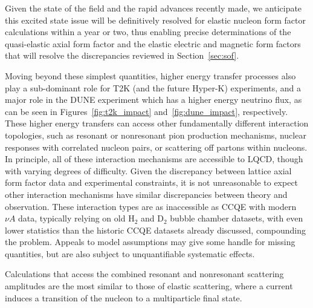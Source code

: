 Given the state of the field and the rapid advances recently made, we anticipate this excited state issue will be definitively resolved for elastic nucleon form factor calculations within a year or two, thus enabling precise determinations of the quasi-elastic axial form factor and the elastic electric and magnetic form factors that will resolve the discrepancies reviewed in Section~\ref{sec:sof}.


Moving beyond these simplest quantities, higher energy transfer processes also play a sub-dominant role for T2K (and the future
Hyper-K) experiments, and a major role in the DUNE experiment which has a higher energy neutrino
flux, as can be seen in Figures~\ref{fig:t2k_impact} and~\ref{fig:dune_impact}, respectively.
These higher energy transfers can access other fundamentally different interaction topologies,
 such as resonant or nonresonant pion production mechanisms,
 nuclear responses with correlated nucleon pairs,
 or scattering off partons within nucleons.
In principle, all of these interaction mechanisms are accessible to LQCD,
 though with varying degrees of difficulty.
Given the discrepancy between lattice axial form factor data and experimental constraints,
 it is not unreasonable to expect other interaction mechanisms have similar discrepancies
 between theory and observation.
These interaction types are as inaccessible as CCQE with modern $\nu A$ data, typically relying on old H$_2$ and D$_2$ bubble chamber datasets, with even lower statistics than the historic CCQE datasets already discussed, compounding the problem.
Appeals to model assumptions may give some handle for missing quantities,
 but are also subject to unquantifiable systematic effects.

Calculations that access the combined resonant and nonresonant scattering amplitudes
 are the most similar to those of elastic scattering,
 where a current induces a transition of the nucleon to a multiparticle final state.

